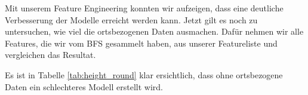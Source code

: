 %
Mit unserem Feature Engineering konnten wir aufzeigen, dass eine deutliche Verbesserung der Modelle erreicht werden kann. Jetzt gilt es noch zu untersuchen, wie viel die ortsbezogenen Daten ausmachen. Dafür nehmen wir alle Features, die wir vom BFS gesammelt haben, aus unserer Featureliste und vergleichen das Resultat.\\
%
\begin{table}[ht]
\centering
{}
\caption{Ergebnisse ohne ortsbezogenen Daten vom BFS}
\label{tab:height_round}
\end{table}
%
Es ist in Tabelle \ref{tab:height_round} klar ersichtlich, dass ohne ortsbezogene Daten ein schlechteres Modell erstellt wird.

